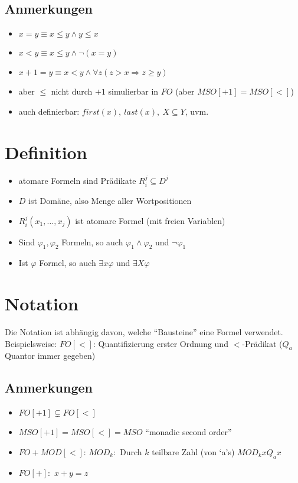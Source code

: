     \subsection{Anmerkungen}
        \begin{itemize}
            \item $x=y\equiv x\le y\wedge y\le x$
            \item $x<y\equiv x\le y\wedge \neg(x=y)$
            \item $x+1=y\equiv x<y\wedge\forall z(z>x\Rightarrow z\geq y)$
            \item aber $\leq$ nicht durch $+1$ simulierbar in $FO$ (aber $MSO[+1]=MSO[<]$)
            \item auch definierbar: $first(x),\ last(x),\ X\subseteq Y$, uvm.
        \end{itemize}
\section{Definition}
    \begin{itemize}
        \item atomare Formeln sind Prädikate $R_i^j\subseteq D^j$
        \item $D$ ist Domäne, also Menge aller Wortpositionen
        \item $R_i^j(x_1,\dots,x_j)$ ist atomare Formel (mit freien Variablen)
        \item Sind $\varphi_1,\varphi_2$ Formeln, so auch $\varphi_1\wedge\varphi_2$ und $\neg \varphi_1$
        \item Ist $\varphi$ Formel, so auch $\exists x\varphi$ und $\exists X\varphi$
    \end{itemize}
\section{Notation}
    Die Notation ist abhängig davon, welche ``Bausteine'' eine Formel verwendet. Beispielsweise:
    $FO[<]$: Quantifizierung erster Ordnung und $<$-Prädikat ($Q_a$ Quantor immer gegeben)\\
    \subsection{Anmerkungen}
        \begin{itemize}
            \item $FO[+1]\subsetneq FO[<]$
            \item $MSO[+1]=MSO[<]=MSO$ ``monadic second order''
            \item $FO+MOD[<]$: $MOD_k:$ Durch $k$ teilbare Zahl (von `a's) $MOD_kxQ_ax$
            \item $FO[+]:$ $x+y=z$
        \end{itemize}
